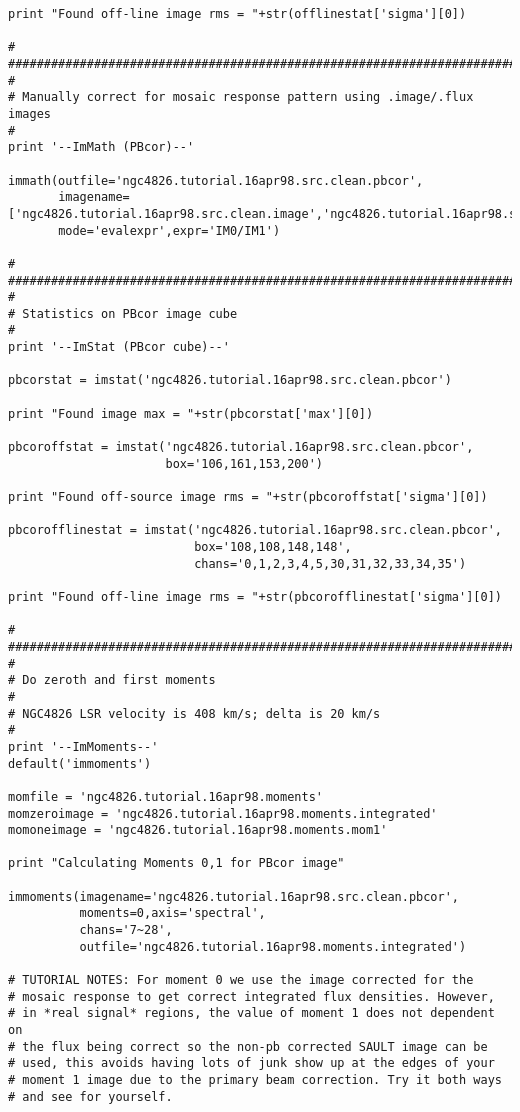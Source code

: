 \begin{verbatim}
print "Found off-line image rms = "+str(offlinestat['sigma'][0])

#
##########################################################################
#
# Manually correct for mosaic response pattern using .image/.flux images
#
print '--ImMath (PBcor)--'

immath(outfile='ngc4826.tutorial.16apr98.src.clean.pbcor',
       imagename=['ngc4826.tutorial.16apr98.src.clean.image','ngc4826.tutorial.16apr98.src.clean.flux'],
       mode='evalexpr',expr='IM0/IM1')

#
##########################################################################
#
# Statistics on PBcor image cube
#
print '--ImStat (PBcor cube)--'

pbcorstat = imstat('ngc4826.tutorial.16apr98.src.clean.pbcor')

print "Found image max = "+str(pbcorstat['max'][0])

pbcoroffstat = imstat('ngc4826.tutorial.16apr98.src.clean.pbcor',
                      box='106,161,153,200')

print "Found off-source image rms = "+str(pbcoroffstat['sigma'][0])

pbcorofflinestat = imstat('ngc4826.tutorial.16apr98.src.clean.pbcor',
                          box='108,108,148,148',
                          chans='0,1,2,3,4,5,30,31,32,33,34,35')

print "Found off-line image rms = "+str(pbcorofflinestat['sigma'][0])

#
##########################################################################
#
# Do zeroth and first moments
#
# NGC4826 LSR velocity is 408 km/s; delta is 20 km/s
#
print '--ImMoments--'
default('immoments')

momfile = 'ngc4826.tutorial.16apr98.moments'
momzeroimage = 'ngc4826.tutorial.16apr98.moments.integrated'
momoneimage = 'ngc4826.tutorial.16apr98.moments.mom1'

print "Calculating Moments 0,1 for PBcor image"

immoments(imagename='ngc4826.tutorial.16apr98.src.clean.pbcor',
          moments=0,axis='spectral',
          chans='7~28',
          outfile='ngc4826.tutorial.16apr98.moments.integrated') 

# TUTORIAL NOTES: For moment 0 we use the image corrected for the
# mosaic response to get correct integrated flux densities. However,
# in *real signal* regions, the value of moment 1 does not dependent on
# the flux being correct so the non-pb corrected SAULT image can be
# used, this avoids having lots of junk show up at the edges of your
# moment 1 image due to the primary beam correction. Try it both ways
# and see for yourself.


\end{verbatim}
